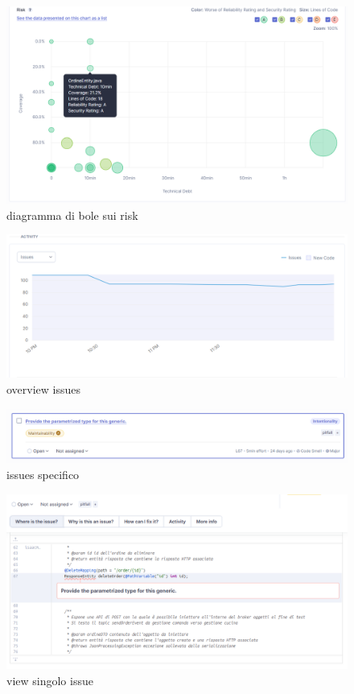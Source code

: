\begin{figure}[htbp]
	\centering
	\includegraphics[scale=0.50]{iterazione1/images/risk.png}
	\caption{diagramma di bole sui risk\label{fig:risk}}
\end{figure}

\begin{figure}[htbp]
	\centering
	\includegraphics[scale=0.50]{iterazione1/images/issues.png}
	\caption{overview issues\label{fig:issues}}
\end{figure}

\begin{figure}[htbp]
	\centering
	\includegraphics[scale=0.50]{iterazione1/images/visione_issue.png}
	\caption{issues specifico\label{fig:visione issues}}
\end{figure}

\begin{figure}[htbp]
	\centering
	\includegraphics[scale=0.50]{iterazione1/images/esempio_issue.png}
	\caption{view singolo issue\label{fig:esempio issue}}
\end{figure}

